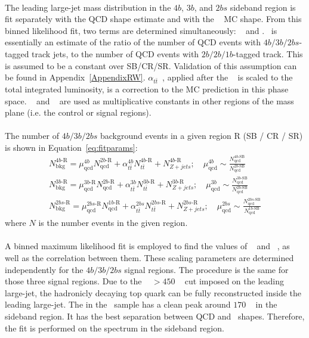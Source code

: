 \paragraph{}
The leading large-\R jet mass distribution in the $4b$, $3b$, and $2bs$ sideband region is fit separately with the QCD shape estimate and with the \ttbar~ MC shape.
From this binned likelihood fit, two terms are determined simultaneously: \muqcd~ and \alphatt. 
\muqcd\ is essentially an estimate of the ratio of the number of QCD events with $4b/3b/2bs$-tagged track jets, to the number of QCD events with $2b/2b/1b$-tagged track.
This is assumed to be a constant over SB/CR/SR.
Validation of this assumption can be found in Appendix~\ref{AppendixRW}.
$\alpha_{t\bar{t}}$~, applied after the \ttbar~ is scaled to the total integrated luminosity, is a correction to the MC prediction in this phase space.
\muqcd~ and \alphatt~ are used as multiplicative constants in other regions of the mass plane (i.e. the control or signal regions).

\paragraph{}
The number of $4b/3b/2bs$ background events in a given region R (SB / CR / SR) is shown in Equation~\ref{eq:fitparams}:
\begin{eqnarray}
\label{eq:fitparams}
N^{4b\text{-R}}_{\text{bkg}} = \mu_{\text{qcd}}^{4b} N^{2b\text{-R}}_{\text{qcd}} + \alpha_{t\bar{t}}^{4b} N^{4b\text{-R}}_{t\bar{t}} + N^{4b\text{-R}}_{Z+jets};
\quad \mu_{\text{qcd}}^{4b} \sim \frac{N^{4b\text{-SB}}_{\text{qcd}}}{N^{2b\text{-SB}}_{\text{qcd}}}
\\
N^{3b\text{-R}}_{\text{bkg}} = \mu_{\text{qcd}}^{3b\text{-R}} N^{2b\text{-R}}_{\text{qcd}} + \alpha_{t\bar{t}}^{3b} N^{3b\text{-R}}_{t\bar{t}} + N^{3b\text{-R}}_{Z+jets} ;
\quad \mu_{\text{qcd}}^{3b} \sim \frac{N^{3b\text{-SB}}_{\text{qcd}}}{N^{2b\text{-SB}}_{\text{qcd}}}\\
N^{2bs\text{-R}}_{\text{bkg}} = \mu_{\text{qcd}}^{2bs\text{-R}} N^{1b\text{-R}}_{\text{qcd}} + \alpha_{t\bar{t}}^{2bs} N^{2bs\text{-R}}_{t\bar{t}} + N^{2bs\text{-R}}_{Z+jets};
\quad \mu_{\text{qcd}}^{2bs} \sim \frac{N^{2bs\text{-SB}}_{\text{qcd}}}{N^{1b\text{-SB}}_{\text{qcd}}}
\end{eqnarray}
where $N$ is the number events in the given region.

\paragraph{}
A binned maximum likelihood fit is employed to find the values of \muqcd~ and \alphatt~, as well as the correlation between them.
These scaling parameters are determined independently for the $4b/3b/2bs$ signal regions.
The procedure is the same for those three signal regions. 
Due to the \pt~ $>450$ \GeV~ cut imposed on the leading large-\R jet, the hadronicly decaying top quark can be fully reconstructed inside the leading large-\R jet. 
The \mleadJ in the \ttbar\ sample has a clean peak around $170$ \GeV~ in the sideband region.
It has the best separation between QCD and \ttbar\ shapes.
Therefore, the fit is performed on the \mleadJ spectrum in the sideband region.


